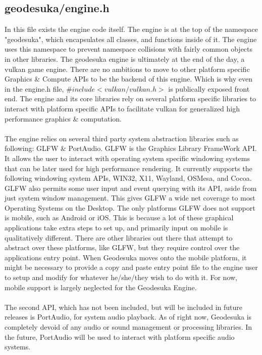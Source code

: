 \documentclass[a4paper,10pt]{book}
\begin{document}
\subsection{geodesuka/engine.h}
In this file exists the engine code itself. The engine is at the top of the namespace "geodesuka", which encapsulates all classes, and functions
inside of it. The engine uses this namespace to prevent namespace collisions with fairly common objects in other libraries. The geodesuka engine
is ultimately at the end of the day, a vulkan game engine. There are no ambitions to move to other platform specific Graphics \& Compute APIs to be
the backend of this engine. Which is why even in the engine.h file, $\#include <vulkan/vulkan.h>$ is publically exposed front end. The engine and its core
libraries rely on several platform specific libraries to interact with platform specific APIs to facilitate vulkan for generalized high performance graphics \&
computation. \\ \\ 
The engine relies on several third party system abstraction libraries such as following: GLFW \& PortAudio. GLFW is the Graphics Library FrameWork API. It allows the user
to interact with operating system specific windowing systems that can be later used for high performance rendering. It currently supports the following windowing system APIs,
WIN32, X11, Wayland, OSMesa, and Cocoa. GLFW also permits some user input and event querying with its API, aside from just system window management. This gives 
GLFW a wide net coverage to most Operating Systems on the Desktop. The only platforms GLFW does not support is mobile, such as Android or iOS. This is because a lot of these
graphical applications take extra steps to set up, and primarily input on mobile is qualitatively different. There are other libraries out there that attempt to abstract over these platforms,
like GLFW, but they require control over the applications entry point. When Geodesuka moves onto the mobile platform, it might be necessary to provide a copy and paste entry point
file to the engine user to setup and modify for whatever he/she/they wish to do with it. For now, mobile support is largely neglected for the Geodesuka Engine. \\ \\
The second API, which has not been included, but will be included in future releases is PortAudio, for system audio playback. As of right now, Geodesuka is completely devoid
of any audio or sound management or processing libraries. In the future, PortAudio will be used to interact with platform specific audio systems. \\ \\
\end{document}
